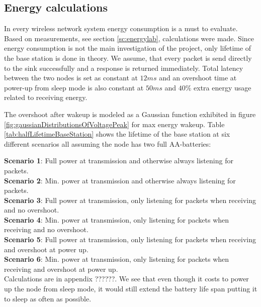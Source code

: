 \subsection{Energy calculations}\label{sc:energyCalculations}

In every wireless network system energy consumption is a must to evaluate. Based on measurements, see section \ref{sc:energylab}, calculations were made. Since energy consumption is not the main investigation of the project, only lifetime of the base station is done in theory. We assume, that every packet is send directly to the sink successfully and a response is returned immediately. Total latency between the two nodes is set as constant at $12 ms$ and an overshoot time at power-up from sleep mode is also constant at $50 ms$ and $40\%$ extra energy usage related to receiving energy.

\noindent The overshoot after wakeup is modeled as a Gaussian function exhibited in figure \ref{fig:gaussianDistributionsOfVoltagePeak} for max energy wakeup. Table \ref{tab:halfLifetimeBaseStation} shows the lifetime of the base station at six different scenarios all assuming the node has two full AA-batteries: %

\noindent \textbf{Scenario 1}: Full power at transmission and otherwise always listening for packets.\\
\textbf{Scenario 2}: Min. power at transmission and otherwise always listening for packets.\\
\textbf{Scenario 3}: Full power at transmission, only listening for packets when receiving and no overshoot.\\
\textbf{Scenario 4}: Min. power at transmission, only listening for packets when receiving and no overshoot.\\
\textbf{Scenario 5}: Full power at transmission, only listening for packets when receiving and overshoot at power up.\\
\textbf{Scenario 6}: Min. power at transmission, only listening for packets when receiving and overshoot at power up.\\

\noindent Calculations are in appendix ??????. We see that even though it costs to power up the node from sleep mode, it would still extend the battery life span putting it to sleep as often as possible. %

